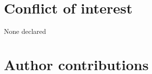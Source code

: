 \section*{Conflict of interest}
\label{sec:conflict1}

None declared
\section*{Author contributions}
\label{sec:author1}

\cleardoublepage

\begin{otherlanguage}{english}

\end{otherlanguage}
